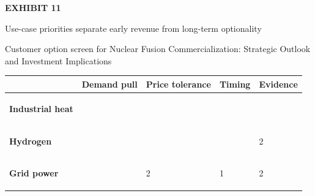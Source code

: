 \documentclass[10pt,a4paper]{article}
\begin{document}
\clearpage
{\textcolor{BOGreen}{\scriptsize\bfseries EXHIBIT 11}}\par\vspace{4pt}
{\sffamily\fontsize{17}{21}\selectfont\color{BONavy} Use-case priorities separate early revenue from long-term optionality}\par
{\small\color{BOText} Customer option screen for Nuclear Fusion Commercialization: Strategic Outlook and Investment Implications}\par\vspace{6pt}
{\scriptsize\begin{tabular}{p{38mm}>{\centering\arraybackslash}p{21mm}>{\centering\arraybackslash}p{21mm}>{\centering\arraybackslash}p{21mm}>{\centering\arraybackslash}p{21mm}}
 & {\bfseries Demand pull} & {\bfseries Price tolerance} & {\bfseries Timing} & {\bfseries Evidence} \\
\hline
{\bfseries Industrial heat} & \colorbox{BOGreen}{\textcolor{white}{\strut\hspace{5pt}5\hspace{5pt}}} & \colorbox{BOGreen}{\textcolor{white}{\strut\hspace{5pt}4\hspace{5pt}}} & \colorbox{BOBlue}{\textcolor{white}{\strut\hspace{5pt}3\hspace{5pt}}} & \colorbox{BOBlue}{\textcolor{white}{\strut\hspace{5pt}3\hspace{5pt}}} \\
{\bfseries Hydrogen} & \colorbox{BOGreen}{\textcolor{white}{\strut\hspace{5pt}4\hspace{5pt}}} & \colorbox{BOGreen}{\textcolor{white}{\strut\hspace{5pt}4\hspace{5pt}}} & \colorbox{BOBlue}{\textcolor{white}{\strut\hspace{5pt}3\hspace{5pt}}} & \colorbox{BOLight}{\textcolor{BOText}{\strut\hspace{5pt}2\hspace{5pt}}} \\
{\bfseries Grid power} & \colorbox{BOGreen}{\textcolor{white}{\strut\hspace{5pt}5\hspace{5pt}}} & \colorbox{BOLight}{\textcolor{BOText}{\strut\hspace{5pt}2\hspace{5pt}}} & \colorbox{BOLight}{\textcolor{BOText}{\strut\hspace{5pt}1\hspace{5pt}}} & \colorbox{BOLight}{\textcolor{BOText}{\strut\hspace{5pt}2\hspace{5pt}}} \\

\end{tabular}}
\end{document}
